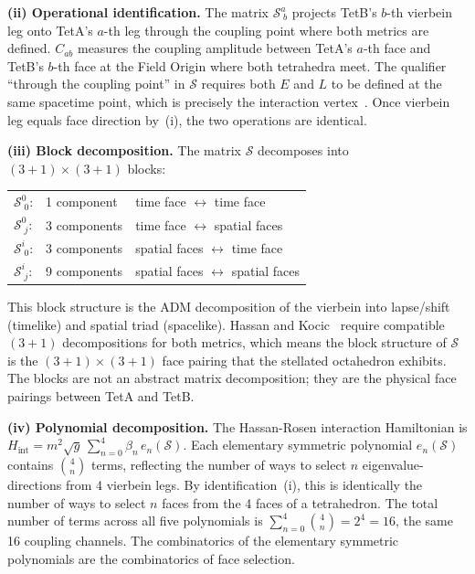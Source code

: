 \documentclass[aps,prd,preprint,superscriptaddress,showpacs,preprintnumbers,amsmath,amssymb,nofootinbib]{revtex4-2}
\begin{document}
\textbf{(ii) Operational identification.} The matrix $\mathcal{S}^a_{\;b}$ projects TetB's $b$-th vierbein leg onto TetA's $a$-th leg through the coupling point where both metrics are defined. $C_{ab}$ measures the coupling amplitude between TetA's $a$-th face and TetB's $b$-th face at the Field Origin where both tetrahedra meet. The qualifier ``through the coupling point'' in $\mathcal{S}$ requires both $E$ and $L$ to be defined at the same spacetime point, which is precisely the interaction vertex~\cite{hinterbichler2012}. Once vierbein leg equals face direction by~(i), the two operations are identical.

\textbf{(iii) Block decomposition.} The matrix $\mathcal{S}$ decomposes into $(3{+}1) \times (3{+}1)$ blocks:
\begin{center}
\renewcommand{\arraystretch}{1.2}
\begin{tabular}{@{}lll@{}}
$\mathcal{S}^0_{\;0}$: & 1 component & time face $\leftrightarrow$ time face \\
$\mathcal{S}^0_{\;j}$: & 3 components & time face $\leftrightarrow$ spatial faces \\
$\mathcal{S}^i_{\;0}$: & 3 components & spatial faces $\leftrightarrow$ time face \\
$\mathcal{S}^i_{\;j}$: & 9 components & spatial faces $\leftrightarrow$ spatial faces \\
\end{tabular}
\end{center}
This block structure is the ADM decomposition of the vierbein into lapse/shift (timelike) and spatial triad (spacelike). Hassan and Kocic~\cite{hassankocic2018} require compatible $(3{+}1)$ decompositions for both metrics, which means the block structure of $\mathcal{S}$ is the $(3{+}1) \times (3{+}1)$ face pairing that the stellated octahedron exhibits. The blocks are not an abstract matrix decomposition; they are the physical face pairings between TetA and TetB.

\textbf{(iv) Polynomial decomposition.} The Hassan-Rosen interaction Hamiltonian is $H_{\text{int}} = m^2\sqrt{g}\,\sum_{n=0}^{4}\beta_n\,e_n(\mathcal{S})$. Each elementary symmetric polynomial $e_n(\mathcal{S})$ contains $\binom{4}{n}$ terms, reflecting the number of ways to select $n$ eigenvalue-directions from 4 vierbein legs. By identification~(i), this is identically the number of ways to select $n$ faces from the 4 faces of a tetrahedron. The total number of terms across all five polynomials is $\sum_{n=0}^{4}\binom{4}{n} = 2^4 = 16$, the same 16 coupling channels. The combinatorics of the elementary symmetric polynomials are the combinatorics of face selection.
\end{document}

